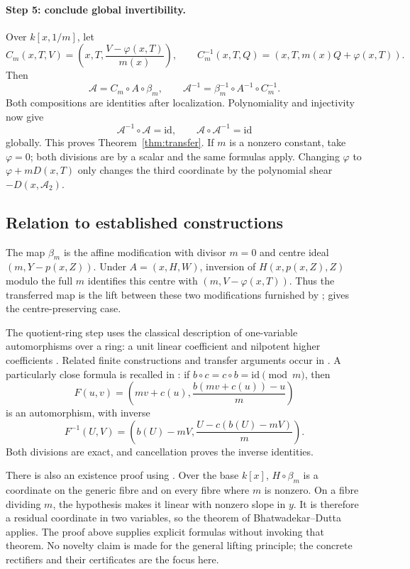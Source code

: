 \documentclass[11pt,a4paper]{article}
\newcommand{\id}{\mathrm{id}}
\newcommand{\comp}{\circ}
\begin{document}
\paragraph{Step 5: conclude global invertibility.}
Over $k[x,1/m]$, let
\[
C_m(x,T,V)=\left(x,T,\frac{V-\varphi(x,T)}{m(x)}\right),\qquad
C_m^{-1}(x,T,Q)=(x,T,m(x)Q+\varphi(x,T)).
\]
Then
\[
\mathcal A=C_m\comp A\comp\beta_m,\qquad
\mathcal A^{-1}=\beta_m^{-1}\comp A^{-1}\comp C_m^{-1}.
\]
Both compositions are identities after localization. Polynomiality and
injectivity now give
\[
\mathcal A^{-1}\comp\mathcal A=\id,
\qquad \mathcal A\comp\mathcal A^{-1}=\id
\]
globally. This proves Theorem~\ref{thm:transfer}.
If $m$ is a nonzero constant, take $\varphi=0$; both divisions are by a
scalar and the same formulas apply. Changing $\varphi$ to $\varphi+mD(x,T)$
only changes the third coordinate by the polynomial shear
$-D(x,\mathcal A_2)$.

\subsection{Relation to established constructions}

The map $\beta_m$ is the affine modification with divisor $m=0$ and
centre ideal $(m,Y-p(x,Z))$. Under $A=(x,H,W)$, inversion of
$H(x,p(x,Z),Z)$ modulo the full $m$ identifies this centre with
$(m,V-\varphi(x,T))$. Thus the transferred map is the lift between these
two modifications furnished by \cite[Proposition~2.1]{KZ};
\cite[Corollary~2.2]{KZ} gives the centre-preserving case.

The quotient-ring step uses the classical description of one-variable
automorphisms over a ring: a unit linear coefficient and nilpotent higher
coefficients \cite[Proposition~1]{EV}. Related finite constructions and
transfer arguments occur in \cite[Theorem~4 and \S5]{EV}.
A particularly close formula is recalled in \cite[\S1, Lemma~1.1]{EVM}:
if $b\circ c=c\circ b=\id\pmod m$, then
\[
F(u,v)=\left(mv+c(u),\frac{b(mv+c(u))-u}{m}\right)
\]
is an automorphism, with inverse
\[
F^{-1}(U,V)=\left(b(U)-mV,\frac{U-c(b(U)-mV)}m\right).
\]
Both divisions are exact, and cancellation proves the inverse identities.

There is also an existence proof using \cite[Theorem~3.2]{BD}. Over the base $k[x]$,
$H\circ\beta_m$ is a coordinate on the generic fibre and on every fibre
where $m$ is nonzero. On a fibre dividing $m$, the hypothesis makes it
linear with nonzero slope in $y$. It is therefore a residual coordinate
in two variables, so the theorem of Bhatwadekar--Dutta applies.
The proof above supplies explicit formulas without invoking that theorem.
No novelty claim is made for the general lifting principle; the concrete
rectifiers and their certificates are the focus here.
\end{document}
